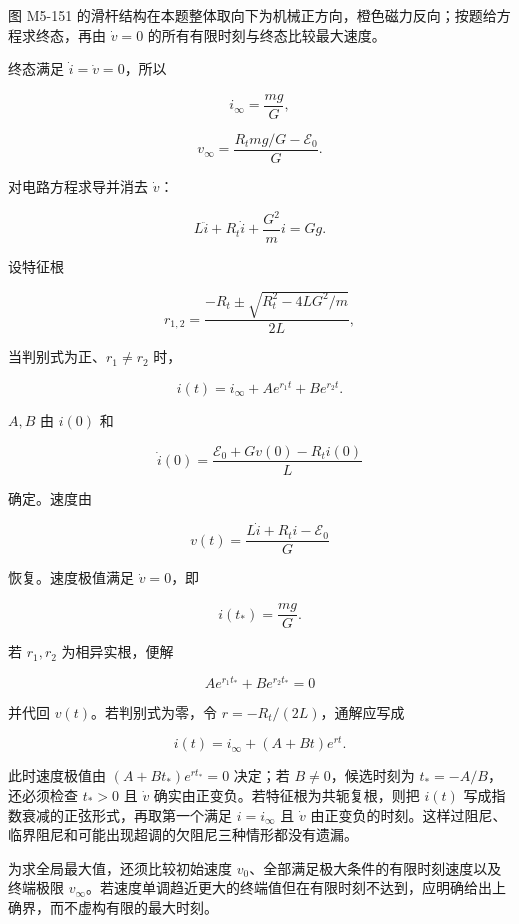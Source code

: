 图 M5-151
的滑杆结构在本题整体取向下为机械正方向，橙色磁力反向；按题给方程求终态，再由
\(\dot v=0\) 的所有有限时刻与终态比较最大速度。

终态满足 \(\dot i=\dot v=0\)，所以

\[
\boxed{i_{\infty}=\frac{mg}{G}},
\]

\[
\boxed{v_{\infty}=\frac{R_tmg/G-\mathcal E_0}{G}}.
\]

对电路方程求导并消去 \(\dot v\)：

\[
\boxed{
L\ddot i+R_t\dot i+\frac{G^2}{m}i=Gg}.
\]

设特征根

\[
r_{1,2}=\frac{-R_t\pm\sqrt{R_t^2-4LG^2/m}}{2L},
\]

当判别式为正、\(r_1\ne r_2\) 时，

\[
i(t)=i_{\infty}+Ae^{r_1t}+Be^{r_2t}.
\]

\(A,B\) 由 \(i(0)\) 和

\[
\dot i(0)=\frac{\mathcal E_0+Gv(0)-R_ti(0)}L
\]

确定。速度由

\[
\boxed{v(t)=\frac{L\dot i+R_ti-\mathcal E_0}{G}}
\]

恢复。速度极值满足 \(\dot v=0\)，即

\[
\boxed{i(t_*)=\frac{mg}{G}}.
\]

若 \(r_1,r_2\) 为相异实根，便解

\[
Ae^{r_1t_*}+Be^{r_2t_*}=0
\]

并代回 \(v(t)\)。若判别式为零，令 \(r=-R_t/(2L)\)，通解应写成

\[
i(t)=i_{\infty}+(A+Bt)e^{rt}.
\]

此时速度极值由 \((A+Bt_*)e^{rt_*}=0\) 决定；若 \(B\ne0\)，候选时刻为
\(t_*=-A/B\)，还必须检查 \(t_*>0\) 且 \(\dot v\)
确实由正变负。若特征根为共轭复根，则把 \(i(t)\)
写成指数衰减的正弦形式，再取第一个满足 \(i=i_{\infty}\) 且 \(\dot v\)
由正变负的时刻。这样过阻尼、临界阻尼和可能出现超调的欠阻尼三种情形都没有遗漏。

为求全局最大值，还须比较初始速度
\(v_0\)、全部满足极大条件的有限时刻速度以及终端极限
\(v_{\infty}\)。若速度单调趋近更大的终端值但在有限时刻不达到，应明确给出上确界，而不虚构有限的最大时刻。

